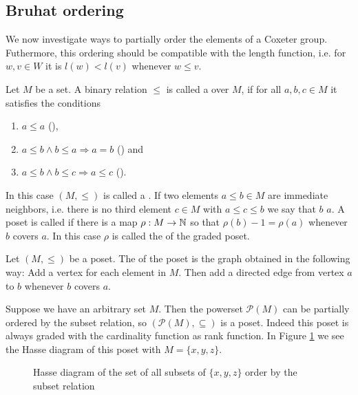 \subsection{Bruhat ordering}
\label{sec:coxeter-groups-bruhat-ordering}

We now investigate ways to partially order the elements of a Coxeter group. Futhermore, this ordering should be compatible with the length function, i.e. for $w,v \in W$ it is $l(w) < l(v)$ whenever $w \leq v$.

\begin{defi}
	Let $M$ be a set. A binary relation $\leq$ is called a  over $M$, if for all $a,b,c \in M$ it satisfies the conditions
	\begin{enumerate}
		\item $a \leq a$ (),
		\item $a \leq b \wedge b \leq a \Rightarrow a=b$ () and
		\item $a \leq b \wedge b \leq c \Rightarrow a \leq c$ ().
	\end{enumerate}
	In this case $(M,\leq)$ is called a . If two elements $a \leq b \in M$ are immediate neighbors, i.e. there is no third element $c \in M$ with $a \leq c \leq b$ we say that $b$  $a$. A poset is called  if there is a map $\rho : M \to \mathbb{N}$ so that $\rho(b) - 1 = \rho(a)$ whenever $b$ covers $a$. In this case $\rho$ is called the  of the graded poset.
\end{defi}

\begin{defi}
	Let $(M,\leq)$ be a poset. The  of the poset is the graph obtained in the following way: Add a vertex for each element in $M$. Then add a directed edge from vertex $a$ to $b$ whenever $b$ covers $a$.
\end{defi}

\begin{exam}
	Suppose we have an arbitrary set $M$. Then the powerset $\mathcal P (M)$ can be partially ordered by the subset relation, so $(\mathcal P (M), \subseteq)$ is a poset. Indeed this poset is always graded with the cardinality function as rank function. In Figure \ref{fig:poset-xyz-subsets} we see the Hasse diagram of this poset with $M = \{x,y,z\}$.

	\begin{figure}[ht]
		\centering
		
		\caption{Hasse diagram of the set of all subsets of $\{x,y,z\}$ order by the subset relation}
		\label{fig:poset-xyz-subsets}
	\end{figure}
\end{exam}

